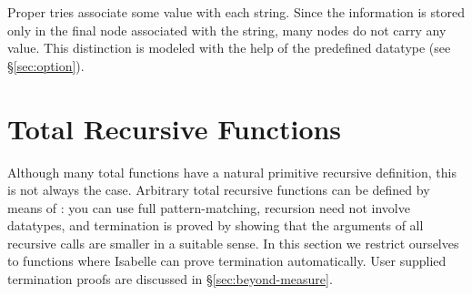 Proper tries associate some value with each string. Since the
information is stored only in the final node associated with the string, many
nodes do not carry any value. This distinction is modeled with the help
of the predefined datatype  (see {\S}\ref{sec:option}).


\section{Total Recursive Functions}
\label{sec:fun}

Although many total functions have a natural primitive recursive definition,
this is not always the case. Arbitrary total recursive functions can be
defined by means of : you can use full pattern-matching,
recursion need not involve datatypes, and termination is proved by showing
that the arguments of all recursive calls are smaller in a suitable sense.
In this section we restrict ourselves to functions where Isabelle can prove
termination automatically. User supplied termination proofs are discussed in
{\S}\ref{sec:beyond-measure}.



